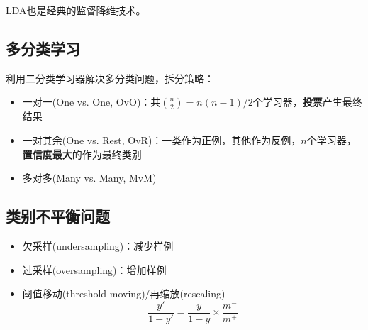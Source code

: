 LDA也是经典的监督降维技术。

\subsection{多分类学习}
利用二分类学习器解决多分类问题，拆分策略：
\begin{itemize}
	\item 一对一(One vs. One, OvO)：共$\binom{n}{2}=n(n-1)/2$个学习器，\textbf{投票}产生最终结果
	\item 一对其余(One vs. Rest, OvR)：一类作为正例，其他作为反例，$n$个学习器，\textbf{置信度最大}的作为最终类别
	\item 多对多(Many vs. Many, MvM)
\end{itemize}

\subsection{类别不平衡问题}
\begin{itemize}
	\item 欠采样(undersampling)：减少样例
	\item 过采样(oversampling)：增加样例
	\item 阈值移动(threshold-moving)/再缩放(rescaling)
	\[\frac{y'}{1-y'}=\frac{y}{1-y}\times\frac{m^-}{m^+}\]
\end{itemize}